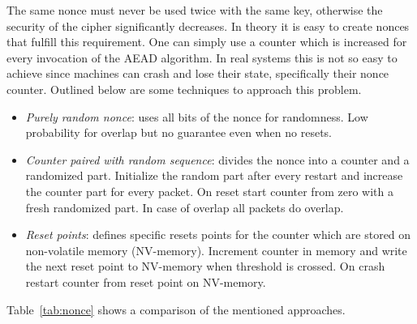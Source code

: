 
The same nonce must never be used twice with the same key, otherwise the security of the
cipher significantly decreases. In theory it is easy to create nonces that fulfill this
requirement. One can simply use a counter which is increased for every invocation of the
AEAD algorithm. In real systems this is not so easy to achieve since machines can crash
and lose their state, specifically their nonce counter. Outlined below are some techniques
to approach this problem.

\begin{itemize}
	\item \textit{Purely random nonce}: uses all bits of the nonce for randomness. Low
	      probability for overlap but no guarantee even when no resets.
	\item \textit{Counter paired with random sequence}: divides the nonce into a counter
	      and a randomized part. Initialize the random part after every restart and increase
	      the counter part for every packet. On reset start counter from zero with a fresh
	      randomized part. In case of overlap all packets do overlap.
	\item \textit{Reset points}: defines specific resets points for the counter which are
	      stored on non-volatile memory (NV-memory). Increment counter in memory and write the
	      next reset point to NV-memory when threshold is crossed. On crash restart counter from
	      reset point on NV-memory.
\end{itemize}

Table~\ref{tab:nonce} shows a comparison of the mentioned approaches.



